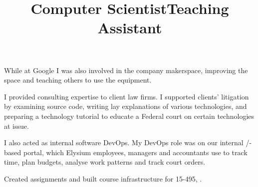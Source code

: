 \begin{resume}
\begin{position}
While at Google I was also involved in the company makerspace, improving the
space and teaching others to use the equipment.

\end{position}


\title{Computer Scientist}
\begin{position}
I provided consulting expertise to client law firms. I supported clients'
litigation by examining source code, writing lay explanations of various
technologies, and preparing a technology tutorial to educate a Federal court on
certain technologies at issue.

I also acted as internal software DevOps. My DevOps role was on our internal
/-based portal, which Elysium employees, managers and
accountants use to track
time, plan budgets, analyse work patterns and track court orders.
\end{position}



% 
\title{Teaching Assistant}
\begin{position}
Created assignments and built course infrastructure for 15-495,
.
\end{position}
% 
 


\end{resume}
